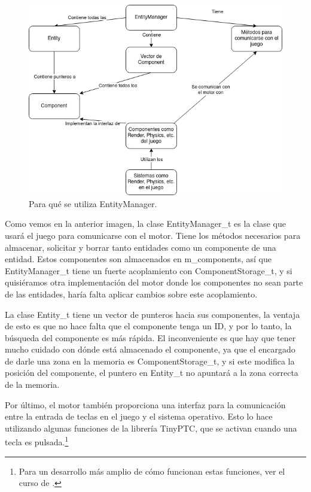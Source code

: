 \begin{figure}[h]
	\centering
	\includegraphics[width=15cm]{archivos/imagenes/Diagrama-funcionamiento-motor.png}
	\caption{Para qué se utiliza EntityManager.}
\end{figure}

Como vemos en la anterior imagen, la clase EntityManager\_t es la clase que usará el juego para comunicarse con el motor. Tiene los métodos necesarios para almacenar, solicitar y borrar tanto entidades como un componente de una entidad. Estos componentes son almacenados en m\_components, así que EntityManager\_t tiene un fuerte acoplamiento con ComponentStorage\_t, y si quisiéramos otra implementación del motor donde los componentes no sean parte de las entidades, haría falta aplicar cambios sobre este acoplamiento.

La clase Entity\_t tiene un vector de punteros hacia sus componentes, la ventaja de esto es que no hace falta que el componente tenga un ID, y por lo tanto, la búsqueda del componente es más rápida. El inconveniente es que hay que tener mucho cuidado con dónde está almacenado el componente, ya que el encargado de darle una zona en la memoria es ComponentStorage\_t, y si este modifica la posición del componente, el puntero en Entity\_t no apuntará a la zona correcta de la memoria. 

Por último, el motor también proporciona una interfaz para la comunicación entre la entrada de teclas en el juego y el sistema operativo. Esto lo hace utilizando algunas funciones de la librería TinyPTC, que se activan cuando una tecla es pulsada.\footnote{Para un desarrollo más amplio de cómo funcionan estas funciones, ver el curso de \citep{CursoMotorC++}.}

